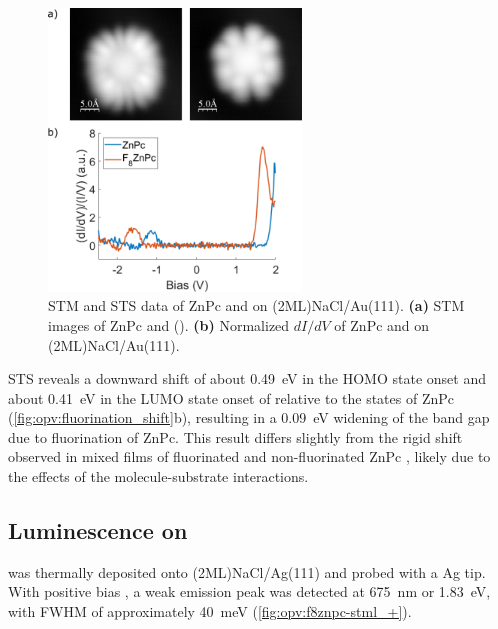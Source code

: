 \begin{figure} [H]
    \centering
        \includegraphics[width=0.6\textwidth]{pictures/znpc_f8znpc_comparison.png}
    \caption{ STM and STS data of ZnPc and  on (2ML)NaCl/Au(111). \textbf{(a)} STM images of ZnPc and  (). \textbf{(b)} Normalized $dI/dV$ of ZnPc and  on (2ML)NaCl/Au(111).  }
    \label{fig:opv:fluorination_shift}
\end{figure}

\ac{STS} reveals a downward shift of about \SI{0.49}{eV} in the HOMO state onset and about \SI{0.41}{eV} in the LUMO state onset of  relative to the states of ZnPc (\autoref{fig:opv:fluorination_shift}b), resulting in a \SI{0.09}{eV} widening of the band gap due to fluorination of ZnPc. This result differs slightly from the rigid shift observed in mixed films of fluorinated and non-fluorinated ZnPc \citep{schwarze2016band}, likely due to the effects of the molecule-substrate interactions.


\subsection{Luminescence on }

 was thermally deposited onto (2ML)NaCl/Ag(111) and probed with a Ag tip. With positive bias , a weak emission peak was detected at \SI{675}{nm} or \SI{1.83}{eV}, with FWHM of approximately \SI{40}{meV} (\autoref{fig:opv:f8znpc-stml_+}). 

